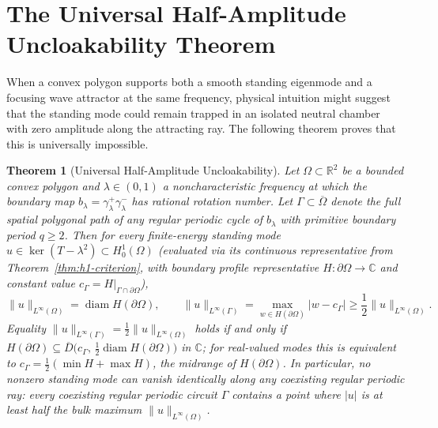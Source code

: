 \documentclass[11pt,reqno]{amsart}
\newtheorem{theorem}{Theorem}[section]
\theoremstyle{definition}
\theoremstyle{remark}
\newcommand{\R}{\mathbb{R}}
\newcommand{\C}{\mathbb{C}}
\DeclareMathOperator{\diam}{diam}
\begin{document}
\section{The Universal Half-Amplitude Uncloakability Theorem}\label{sec:uncloakability}

When a convex polygon supports both a smooth standing eigenmode and a focusing wave attractor at the same frequency, physical intuition might suggest that the standing mode could remain trapped in an isolated neutral chamber with zero amplitude along the attracting ray. The following theorem proves that this is universally impossible.

\begin{theorem}[Universal Half-Amplitude Uncloakability]\label{thm:uncloakable}
Let $\Omega \subset \R^2$ be a bounded convex polygon and $\lambda \in (0,1)$ a noncharacteristic frequency at which the boundary map $b_\lambda = \gamma_\lambda^+ \gamma_\lambda^-$ has rational rotation number. Let $\Gamma \subset \overline{\Omega}$ denote the full spatial polygonal path of any regular periodic cycle of $b_\lambda$ with primitive boundary period $q \ge 2$. Then for every finite-energy standing mode $u \in \ker(T - \lambda^2) \subset H_0^1(\Omega)$ (evaluated via its continuous representative from Theorem~\ref{thm:h1-criterion}, with boundary profile representative $H \colon \partial\Omega \to \C$ and constant value $c_\Gamma = H|_{\Gamma \cap \partial\Omega}$),
\begin{equation}\label{eq:uncloakable-exact}
  \|u\|_{L^\infty(\Omega)} = \diam H(\partial\Omega), \qquad
  \|u\|_{L^\infty(\Gamma)} = \max_{w \in H(\partial\Omega)} |w - c_\Gamma| \ge \frac{1}{2}\|u\|_{L^\infty(\Omega)}.
\end{equation}
Equality $\|u\|_{L^\infty(\Gamma)} = \frac{1}{2}\|u\|_{L^\infty(\Omega)}$ holds if and only if $H(\partial\Omega) \subseteq \overline{D}\bigl(c_\Gamma,\, \frac{1}{2}\diam H(\partial\Omega)\bigr)$ in $\C$; for real-valued modes this is equivalent to $c_\Gamma = \frac{1}{2}(\min H + \max H)$, the midrange of $H(\partial\Omega)$. In particular, no nonzero standing mode can vanish identically along any coexisting regular periodic ray: every coexisting regular periodic circuit $\Gamma$ contains a point where $|u|$ is at least half the bulk maximum $\|u\|_{L^\infty(\Omega)}$.
\end{theorem}
\end{document}
